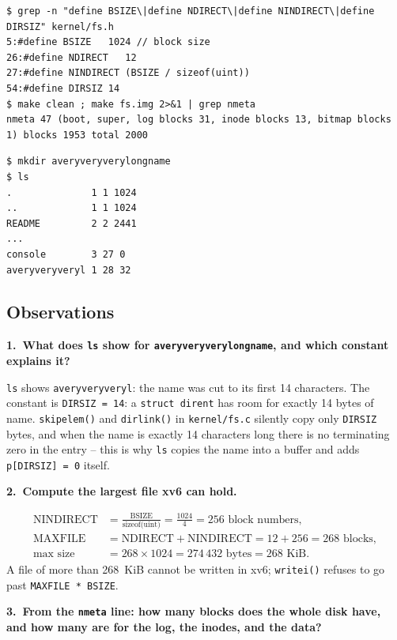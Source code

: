 \documentclass[12pt,a4paper]{article}
\newcommand{\qa}[2]{%
  \par\needspace{5\baselineskip}\medskip
  \noindent\textbf{#1.~#2}\par\smallskip\noindent}
\begin{document}
\begin{lstlisting}[style=terminal,caption={The constants in kernel/fs.h and the layout printed by mkfs}]
$ grep -n "define BSIZE\|define NDIRECT\|define NINDIRECT\|define DIRSIZ" kernel/fs.h
5:#define BSIZE   1024 // block size
26:#define NDIRECT   12
27:#define NINDIRECT (BSIZE / sizeof(uint))
54:#define DIRSIZ 14
$ make clean ; make fs.img 2>&1 | grep nmeta
nmeta 47 (boot, super, log blocks 31, inode blocks 13, bitmap blocks 1) blocks 1953 total 2000
\end{lstlisting}

\begin{lstlisting}[style=terminal,caption={A name that is too long}]
$ mkdir averyveryverylongname
$ ls
.              1 1 1024
..             1 1 1024
README         2 2 2441
...
console        3 27 0
averyveryveryl 1 28 32
\end{lstlisting}

\subsection*{Observations}

\qa{1}{What does \texttt{ls} show for \texttt{averyveryverylongname}, and which constant explains it?}
\texttt{ls} shows \texttt{averyveryveryl}: the name was cut to its first 14 characters. The constant is \texttt{DIRSIZ = 14}: a \texttt{struct dirent} has room for exactly 14 bytes of name. \texttt{skipelem()} and \texttt{dirlink()} in \texttt{kernel/fs.c} silently copy only \texttt{DIRSIZ} bytes, and when the name is exactly 14 characters long there is no terminating zero in the entry -- this is why \texttt{ls} copies the name into a buffer and adds \texttt{p[DIRSIZ] = 0} itself.

\qa{2}{Compute the largest file xv6 can hold.}
\begin{align*}
  \text{NINDIRECT} &= \frac{\text{BSIZE}}{\text{sizeof(uint)}} = \frac{1024}{4} = 256 \text{ block numbers},\\
  \text{MAXFILE} &= \text{NDIRECT} + \text{NINDIRECT} = 12 + 256 = 268 \text{ blocks},\\
  \text{max size} &= 268 \times 1024 = 274\,432 \text{ bytes} = 268 \text{ KiB}.
\end{align*}
A file of more than 268~KiB cannot be written in xv6; \texttt{writei()} refuses to go past \texttt{MAXFILE * BSIZE}.

\qa{3}{From the \texttt{nmeta} line: how many blocks does the whole disk have, and how many are for the log, the inodes, and the data?}
\end{document}
